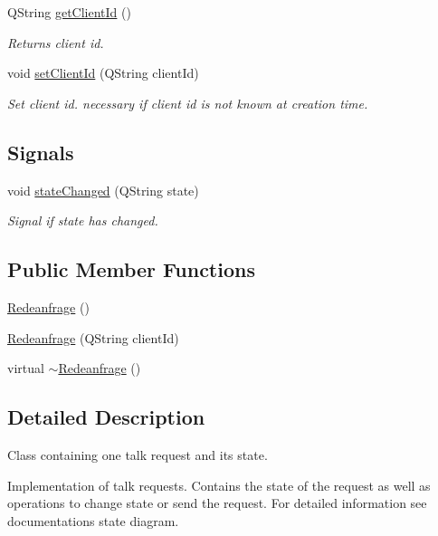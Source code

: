 \begin{DoxyCompactItemize}
Q\+String \hyperlink{class_redeanfrage_a20a2511b30819dcdfff28248f231d592}{get\+Client\+Id} ()
\begin{DoxyCompactList}\small\item\em Returns client id. \end{DoxyCompactList}\item 
void \hyperlink{class_redeanfrage_a076d330b3ee5a4ddc23c064435df0c3d}{set\+Client\+Id} (Q\+String client\+Id)
\begin{DoxyCompactList}\small\item\em Set client id. necessary if client id is not known at creation time. \end{DoxyCompactList}\end{DoxyCompactItemize}
\subsection*{Signals}
\begin{DoxyCompactItemize}
\item 
void \hyperlink{class_redeanfrage_a0e4f160b9abaa1ec463d7b50539cc2d7}{state\+Changed} (Q\+String state)
\begin{DoxyCompactList}\small\item\em Signal if state has changed. \end{DoxyCompactList}\end{DoxyCompactItemize}
\subsection*{Public Member Functions}
\begin{DoxyCompactItemize}
\item 
\hyperlink{class_redeanfrage_af0ad449227e01e5c845479bb3482d657}{Redeanfrage} ()
\item 
\hyperlink{class_redeanfrage_a94a97414b39dff0a18c84621b385c6d4}{Redeanfrage} (Q\+String client\+Id)
\item 
virtual \hyperlink{class_redeanfrage_a0b74c9f48b5ab8421bd8f70dede0705a}{$\sim$\+Redeanfrage} ()
\end{DoxyCompactItemize}


\subsection{Detailed Description}
Class containing one talk request and its state. 

Implementation of talk requests. Contains the state of the request as well as operations to change state or send the request. For detailed information see documentation\textquotesingle{}s state diagram. 

